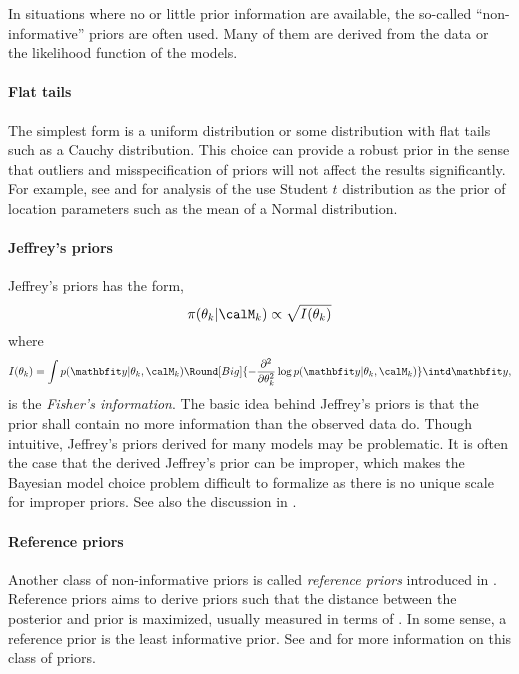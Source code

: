 In situations where no or little prior information are available, the
so-called ``non-informative'' priors are often used. Many of them are derived
from the data or the likelihood function of the models.

\paragraph{Flat tails}

The simplest form is a uniform distribution or some distribution with flat
tails such as a Cauchy distribution. This choice can provide a robust prior in
the sense that outliers and misspecification of priors will not affect the
results significantly. For example, see \cite{OHagan:1990vx} and
\cite{Fan:1992vx} for analysis of the use Student $t$ distribution as the
prior of location parameters such as the mean of a Normal distribution.

\paragraph{Jeffrey's priors}

Jeffrey's priors \cite{Jeffreys:1946jf} has the form,
\begin{equation}
  \pi(\theta_k|\calM_k)\propto\sqrt{I(\theta_k)}
\end{equation}
where
\begin{equation}
  I(\theta_k) = \int p(\data|\theta_k,\calM_k)\Round[Big]{
    -\frac{\partial^2}{\partial\theta_k^2}\log p(\data|\theta_k,\calM_k)}
  \intd\data,
\end{equation}
is the \emph{Fisher's information}. The basic idea behind Jeffrey's priors is
that the prior shall contain no more information than the observed data do.
Though intuitive, Jeffrey's priors derived for many models may be problematic.
It is often the case that the derived Jeffrey's prior can be improper, which
makes the Bayesian model choice problem difficult to formalize as there is no
unique scale for improper priors. See also the discussion in
\cite{Kass:1995vb}.

\paragraph{Reference priors}

Another class of non-informative priors is called \emph{reference priors}
introduced in \cite{Bernardo:1979uq}. Reference priors aims to derive priors
such that the distance between the posterior and prior is maximized, usually
measured in terms of \kl \cite{Kullback:1951va}. In some sense, a reference
prior is the least informative prior. See \cite{Berger:1989vj, Berger:1992kf,
  Berger:1992wo} and \cite[][sec.~5.4]{Bernardo:1994vd} for more information
on this class of priors.

